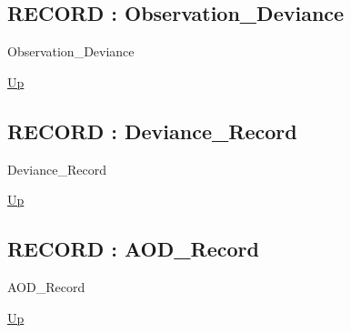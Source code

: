 \par
\par
\subsection*{RECORD : Observation\_Deviance}
\hypertarget{ecldoc:logisticregression.types.observation_deviance}{}
\begin{minipage}[t]{\textwidth}
\begin{flushleft}
 Observation\_Deviance 
\end{flushleft}
\end{minipage}
\hyperlink{ecldoc:LogisticRegression.Types}{Up}

\par
\par
\subsection*{RECORD : Deviance\_Record}
\hypertarget{ecldoc:logisticregression.types.deviance_record}{}
\begin{minipage}[t]{\textwidth}
\begin{flushleft}
 Deviance\_Record 
\end{flushleft}
\end{minipage}
\hyperlink{ecldoc:LogisticRegression.Types}{Up}

\par
\par
\subsection*{RECORD : AOD\_Record}
\hypertarget{ecldoc:logisticregression.types.aod_record}{}
\begin{minipage}[t]{\textwidth}
\begin{flushleft}
 AOD\_Record 
\end{flushleft}
\end{minipage}
\hyperlink{ecldoc:LogisticRegression.Types}{Up}

\par
\par

